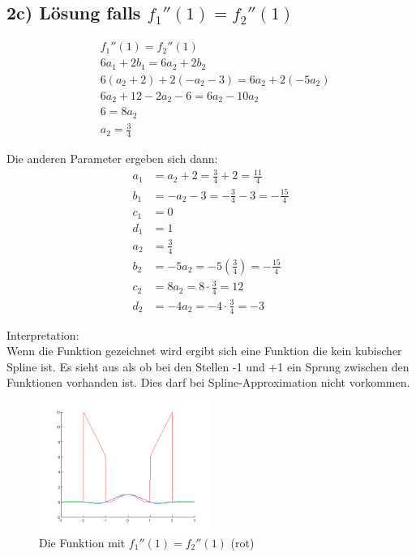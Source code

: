 \documentclass[a4paper,11pt,oneside]{scrartcl}
\begin{document}
\subsection*{2c) Lösung falls $f_1''(1) = f_2''(1)$}
\begin{align*}
&f_1''(1) = f_2''(1)\\
&6a_1 + 2b_1 = 6a_2 + 2b_2\\
&6(a_2 + 2) + 2(-a_2 - 3) = 6a_2 + 2(-5a_2)\\
&6a_2 + 12 -2a_2 -6 = 6a_2 -10a_2\\
&6 = 8a_2\\
&a_2 = \frac{3}{4}
\end{align*}

Die anderen Parameter ergeben sich dann:
\begin{align*}
a_1 &= a_2 + 2 = \frac{3}{4} + 2 = \frac{11}{4}\\
b_1 &= -a_2 - 3 = -\frac{3}{4} - 3 = -\frac{15}{4}\\
c_1 &= 0\\
d_1 &= 1\\
a_2 &= \frac{3}{4}\\
b_2 &= -5a_2 = -5(\frac{3}{4}) = -\frac{15}{4}\\
c_2 &= 8a_2 = 8 \cdot \frac{3}{4} = 12\\
d_2 &= -4a_2 = -4 \cdot \frac{3}{4} = -3
\end{align*}

Interpretation:\\
Wenn die Funktion gezeichnet wird ergibt sich eine Funktion die kein kubischer Spline ist. Es sieht aus als ob bei den Stellen -1 und +1 ein Sprung zwischen den Funktionen vorhanden ist. Dies darf bei Spline-Approximation nicht vorkommen.

\begin{figure}
\begin{center}
\includegraphics[width=0.5\textwidth]{spline2}
\end{center}
\caption{Die Funktion mit $f_1''(1) = f_2''(1)$ (rot)}
\end{figure}
\end{document}
